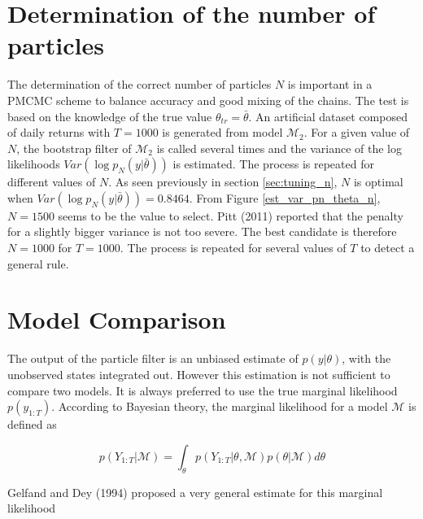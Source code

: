 \documentclass[11pt,a4,twosided,singlespacing,titlepagenumber=on]{scrreprt}
\numberwithin{equation}{chapter} %
\theoremstyle{remark}
\begin{document}
\section{Determination of the number of particles}
The determination of the correct number of particles $N$ is important in a PMCMC scheme to balance accuracy and good mixing of the chains. The test is based on the knowledge of the true value $\theta_{tr} = \bar{\theta}$. An artificial dataset composed of daily returns with $T=1000$ is generated from model $\mathcal{M}_2$. For a given value of $N$, the bootstrap filter of $\mathcal{M}_2$ is called several times and the variance of the log likelihoods $Var(\log p_N(y|\bar{\theta}))$ is estimated. The process is repeated for different values of $N$. As seen previously in section \ref{sec:tuning_n}, $N$ is optimal when $Var(\log p_N(y|\bar{\theta})) = 0.8464$. From Figure \ref{est_var_pn_theta_n}, $N = 1500$ seems to be the value to select. Pitt (2011) reported that the penalty for a slightly bigger variance is not too severe. The best candidate is therefore $N = 1000$ for $T=1000$. The process is repeated for several values of $T$ to detect a general rule.

\section{Model Comparison}
The output of the particle filter is an unbiased estimate of $p(y|\theta)$, with the unobserved states integrated out. However this estimation is not sufficient to compare two models. It is always preferred to use the true marginal likelihood $p(y_{1:T})$. According to Bayesian theory, the marginal likelihood for a model $\mathcal{M}$ is defined as

$$p(Y_{1:T} | \mathcal{M}) = \int_{\theta} p(Y_{1:T} | \theta, \mathcal{M}) p(\theta | \mathcal{M}) d\theta$$

\noindent
Gelfand and Dey (1994) proposed a very general estimate for this marginal likelihood
\end{document}
